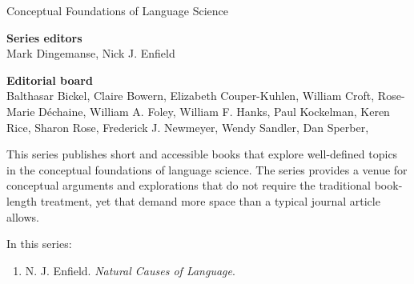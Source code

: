 {\large Conceptual Foundations of Language Science}

\bigskip

\textbf{Series editors}\\
Mark Dingemanse, %
Nick J. Enfield %


\bigskip


\textbf{Editorial board} \\
Balthasar Bickel, %
Claire Bowern, %
Elizabeth Couper-Kuhlen, %
William Croft, %
Rose-Marie Déchaine, %
William A. Foley, %
William F. Hanks, %
Paul Kockelman, %
Keren Rice, %
Sharon Rose, %
Frederick J. Newmeyer, %
Wendy Sandler, %
Dan Sperber, %


\bigskip

\begin{minipage}{\textwidth}%



This series publishes short and accessible books that explore well-defined topics in the conceptual foundations of language science. The series provides a venue for conceptual arguments and explorations that do not require the traditional book-length treatment, yet that demand more space than a typical journal article allows.  
\end{minipage}

\bigskip

In this series:

\begin{enumerate}
\item N. J. Enfield. \textit{Natural Causes of Language}.

\end{enumerate}

% 
% 


